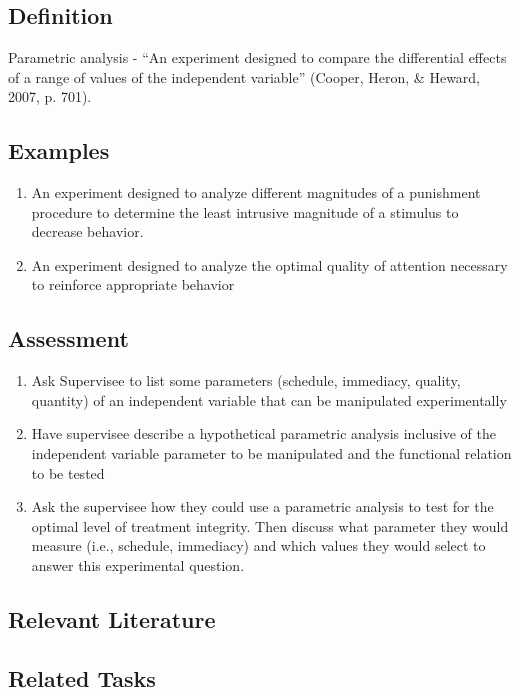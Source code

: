 \clearpage \section[\fourbEleven{}]{\fourbEleven{}%
              }
\subsection{Definition}
Parametric analysis - ``An experiment designed to compare the differential effects of a range of values of the independent variable'' (Cooper, Heron, \& Heward, 2007, p. 701).
%
\subsection{Examples}
\begin{enumerate}
\item An experiment designed to analyze different magnitudes of a punishment procedure to determine the least intrusive magnitude of a stimulus to decrease behavior.
\item An experiment designed to analyze the optimal quality of attention necessary to reinforce appropriate behavior 
\end{enumerate}
%
\subsection{Assessment}
\begin{enumerate}
\item Ask Supervisee to list some parameters (schedule, immediacy, quality, quantity) of an independent variable that can be manipulated experimentally
\item Have supervisee describe a hypothetical parametric analysis inclusive of the independent variable parameter to be manipulated and the functional relation to be tested 
\item Ask the supervisee how they could use a parametric analysis to test for the optimal level of treatment integrity. Then discuss what parameter they would measure (i.e., schedule, immediacy) and which values they would select to answer this experimental question.  
\end{enumerate}
%
\subsection{Relevant Literature}
\begin{refsection}
\nocite{cooper2007applied,lerman1996methodology,lerman2002reinforcement}
\printbibliography[heading=none]
\end{refsection}
%
\subsection{Related Tasks} 
\fourbThree{}\\
\fourFKThirtyThree{}\\

